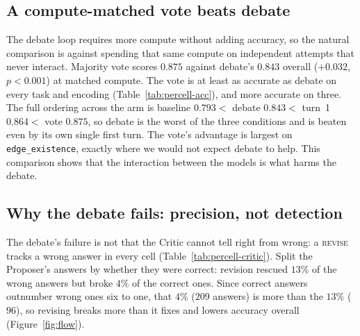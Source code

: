 \documentclass[11pt]{article}
\begin{document}
\subsection{A compute-matched vote beats debate}
\label{sec:vote}
The debate loop requires more compute without adding accuracy, so the natural comparison is
against spending that same compute on independent attempts that never interact. Majority vote
scores $0.875$ against debate's $0.843$ overall ($+0.032$, $p<0.001$) at matched
compute. The vote is at least as accurate as debate on every task and encoding
(Table~\ref{tab:percell-acc}), and more accurate on three. The full
ordering across the arm is baseline $0.793 <$ debate $0.843 <$ turn~1 $0.864 <$ vote
$0.875$, so debate is the worst of the three conditions and is
beaten even by its own single first turn. The vote's advantage is largest on
\texttt{edge\_existence}, exactly where we would not expect
debate to help. This comparison shows that the interaction between the models is what harms the debate.


\subsection{Why the debate fails: precision, not detection}
\label{sec:mechanism}
The debate's failure is not that the Critic cannot tell right from wrong: a
\textsc{revise} tracks a wrong answer in every cell (Table~\ref{tab:percell-critic}).
Split the
Proposer's answers by whether they were correct: revision rescued $13\%$ of the wrong
answers but broke $4\%$ of the correct ones. Since correct answers outnumber wrong
ones six to one, that $4\%$ ($209$ answers) is more than the $13\%$ ($96$), so
revising breaks more than it fixes and lowers accuracy overall (Figure~\ref{fig:flow}).
\end{document}
